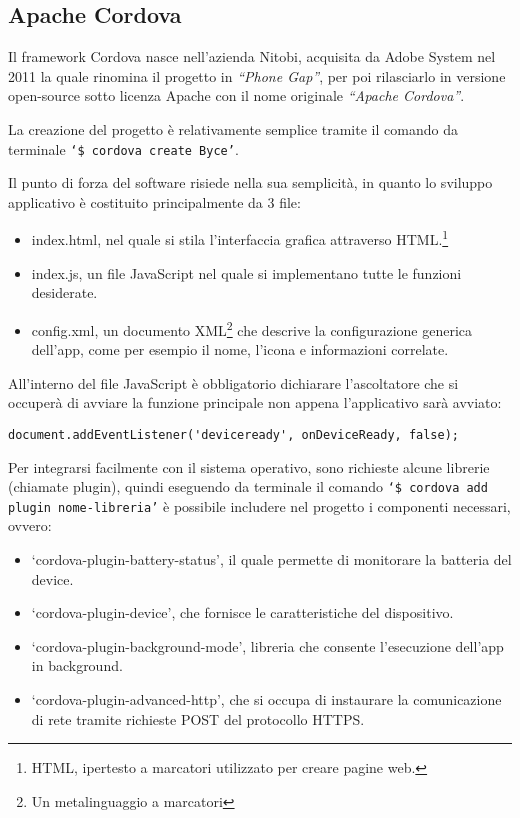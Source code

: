 \documentclass[target=bach]{thud}
\begin{document}
    \subsection{Apache Cordova}
        Il framework Cordova nasce nell'azienda Nitobi, acquisita da Adobe System nel 2011 la quale rinomina il progetto in \textit{``Phone Gap''}, per poi rilasciarlo in versione open-source sotto licenza Apache con il nome originale \textit{``Apache Cordova''}.

    La creazione del progetto è relativamente semplice tramite il comando da terminale \texttt{`\$ cordova create Byce'}.

    Il punto di forza del software risiede nella sua semplicità, in quanto lo sviluppo applicativo è costituito principalmente da 3 file:
    \begin{itemize}
        \setlength{\itemsep}{1pt}
      \item index.html, nel quale si stila l'interfaccia grafica attraverso HTML.\footnote[3]{HTML, ipertesto a marcatori utilizzato per creare pagine web.}
      \item index.js, un file JavaScript nel quale si implementano tutte le funzioni desiderate.
      \item config.xml, un documento XML\footnote[4]{Un metalinguaggio a marcatori} che descrive la configurazione generica dell'app, come per esempio il nome, l'icona e informazioni correlate.
    \end{itemize}

    \newpage

    All'interno del file JavaScript è obbligatorio dichiarare l'ascoltatore che si occuperà di avviare la funzione principale non appena l'applicativo sarà avviato:
\begin{lstlisting}
document.addEventListener('deviceready', onDeviceReady, false);
\end{lstlisting}

    Per integrarsi facilmente con il sistema operativo, sono richieste alcune librerie (chiamate plugin), quindi eseguendo da terminale il comando \texttt{`\$ cordova add plugin {{nome-libreria}}'} è possibile includere nel progetto i componenti necessari, ovvero:
    \begin{itemize}
        \setlength{\itemsep}{1pt}
        \item `cordova-plugin-battery-status', il quale permette di monitorare la batteria del device.
        \item `cordova-plugin-device', che fornisce le caratteristiche del dispositivo.
        \item `cordova-plugin-background-mode', libreria che consente l'esecuzione dell'app in background.
        \item `cordova-plugin-advanced-http', che si occupa di instaurare la comunicazione di rete tramite richieste POST del protocollo HTTPS.
    \end{itemize}
\end{document}
